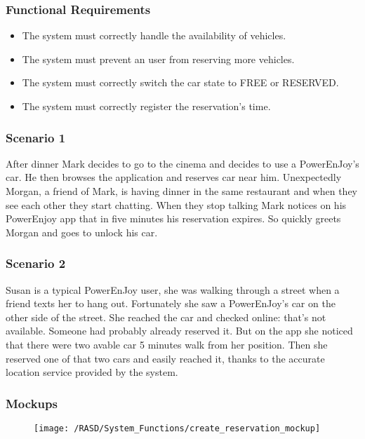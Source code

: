 \subsubsection{Functional Requirements}
\begin{itemize}
  \item The system must correctly handle the availability of vehicles.
  \item The system must prevent an user from reserving more vehicles.
  \item The system must correctly switch the car state to FREE or RESERVED.
  \item The system must correctly register the reservation's time.
\end{itemize}

\subsubsection{Scenario 1}
After dinner Mark decides to go to the cinema and decides to use a PowerEnJoy's car. He then browses the application and reserves car near him.
Unexpectedly Morgan, a friend of Mark, is having dinner in the same restaurant and when they see each other they start chatting. When they stop talking Mark notices on his PowerEnjoy app that in five minutes his reservation expires. So quickly greets Morgan and goes to unlock his car.

\subsubsection{Scenario 2}
Susan is a typical PowerEnJoy user, she was walking through a street when a friend texts her to hang out. Fortunately she saw a PowerEnJoy's car on the other side of the street. She reached the car and checked online: that's not available. Someone had probably already reserved it. But on the app she noticed that there were two avable car 5 minutes walk from her position. Then she reserved one of that two cars and easily reached it, thanks to the accurate location service provided by the system. 


\newpage
\subsubsection{Mockups}
\begin{figure}[!ht]
  \centering
  \vspace{0.1cm}
  \texttt{[image: /RASD/System\_Functions/create\_reservation\_mockup]}\\
  \vspace{0.4cm}
  \label{fig:create_reservation_mockup} 
\end{figure}


